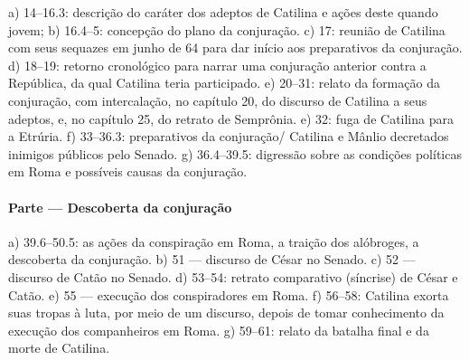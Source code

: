 a)	14--16.3: descrição do caráter dos adeptos de Catilina e ações deste
quando jovem; b)	16.4--5: concepção do plano da conjuração.  c) 	17:
reunião de Catilina com seus sequazes em junho de 64 para dar início aos preparativos 
da conjuração.  d)	18--19: retorno cronológico para narrar uma conjuração
anterior contra a República, da qual Catilina teria participado.  e)	20--31:
relato da formação da conjuração, com intercalação, no capítulo 20, do discurso
de Catilina a seus adeptos, e, no capítulo 25, do retrato de Semprônia.  e)
32:  fuga de Catilina para a Etrúria.  f)	33--36.3: preparativos da
conjuração/ Catilina e Mânlio decretados inimigos públicos pelo Senado.  g)
36.4--39.5: digressão sobre as condições políticas em Roma e possíveis causas
da conjuração.	 	

\paragraph{Parte  --- Descoberta da conjuração}

a)	39.6--50.5: as ações da conspiração em Roma, a traição dos alóbroges, a
descoberta da conjuração.  b)	51 --- discurso de César no Senado.  c)	52 ---
discurso de Catão no Senado.  d)	53--54: retrato comparativo (síncrise) de César e Catão.
e)	55 --- execução dos conspiradores em Roma.  f)	56--58: Catilina exorta
suas tropas à luta, por meio de um discurso, depois de tomar conhecimento da
execução dos companheiros em Roma.  g)	59--61: relato da batalha final e da
morte de Catilina. 

